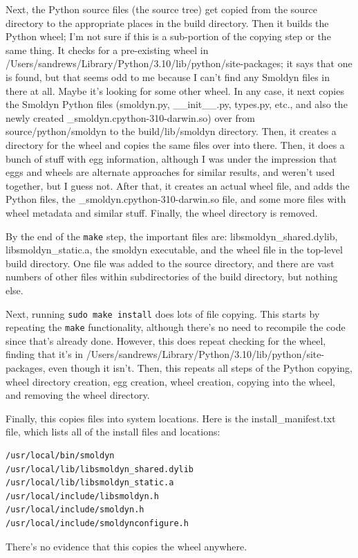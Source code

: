 \documentclass {scrbook}
\newcommand {\ttt} {\texttt}
\begin{document}
Next, the Python source files (the source tree) get copied from the source directory to the appropriate places in the build directory. Then it builds the Python wheel; I'm not sure if this is a sub-portion of the copying step or the same thing. It checks for a pre-existing wheel in /Users/sandrews/Library/Python/3.10/lib/python/site-packages; it says that one is found, but that seems odd to me because I can't find any Smoldyn files in there at all. Maybe it's looking for some other wheel. In any case, it next copies the Smoldyn Python files (smoldyn.py, \_\_init\_\_.py, types.py, etc., and also the newly created \_smoldyn.cpython-310-darwin.so) over from source/python/smoldyn to the build/lib/smoldyn directory. Then, it creates a directory for the wheel and copies the same files over into there. Then, it does a bunch of stuff with egg information, although I was under the impression that eggs and wheels are alternate approaches for similar results, and weren't used together, but I guess not. After that, it creates an actual wheel file, and adds the Python files, the \_smoldyn.cpython-310-darwin.so file, and some more files with wheel metadata and similar stuff. Finally, the wheel directory is removed.

By the end of the \ttt{make} step, the important files are: libsmoldyn\_shared.dylib, libsmoldyn\_static.a, the smoldyn executable, and the wheel file in the top-level build directory. One file was added to the source directory, and there are vast numbers of other files within subdirectories of the build directory, but nothing else.

Next, running \ttt{sudo make install} does lots of file copying. This starts by repeating the \ttt{make} functionality, although there's no need to recompile the code since that's already done. However, this does repeat checking for the wheel, finding that it's in /Users/sandrews/Library/Python/3.10/lib/python/site-packages, even though it isn't. Then, this repeats all steps of the Python copying, wheel directory creation, egg creation, wheel creation, copying into the wheel, and removing the wheel directory.

Finally, this copies files into system locations. Here is the install\_manifest.txt file, which lists all of the install files and locations:
\begin{verbatim}
/usr/local/bin/smoldyn
/usr/local/lib/libsmoldyn_shared.dylib
/usr/local/lib/libsmoldyn_static.a
/usr/local/include/libsmoldyn.h
/usr/local/include/smoldyn.h
/usr/local/include/smoldynconfigure.h
\end{verbatim}
There's no evidence that this copies the wheel anywhere.
\end{document}

